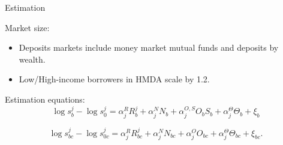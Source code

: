 \documentclass[notes,10pt, aspectratio=169]{beamer}
\newenvironment{wideitemize}{\itemize\addtolength{\itemsep}{10pt}}{\enditemize}
\begin{document}
\begin{frame}{Estimation}

        \vspace{0.3cm}
        \begin{wideitemize}
    
            \item Market size:  
            \begin{itemize}
            \item Deposits markets include money market mutual funds and deposits by wealth.
            \item Low/High-income borrowers in HMDA scale by 1.2.
            \end{itemize}
            \item 
 Estimation equations: 
            $$
            \log s_b^j-\log s_0^j=\alpha_j^R R_b^j+\alpha_j^N N_b+\alpha_j^{O, S} O_b S_b+\alpha_j^{\Theta} \Theta_b+\xi_b
            $$
            
            
            
            $$
            \log s_{b c}^j-\log s_{0 c}^j=\alpha_j^R R_{b c}^j+\alpha_j^N N_{b c}+\alpha_j^O O_{b c}+\alpha_j^{\Theta} \Theta_{b c}+\xi_{b c} .
            $$

    \end{wideitemize}

\end{frame}
\end{document}
